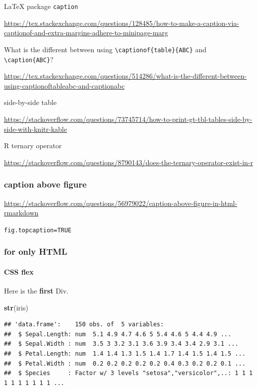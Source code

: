 \documentclass[
]{book}
\newenvironment{Shaded}{\begin{snugshade}}{\end{snugshade}}
\newcommand{\FunctionTok}[1]{\textcolor[rgb]{0.13,0.29,0.53}{\textbf{#1}}}
\newcommand{\NormalTok}[1]{#1}
\theoremstyle{definition}
\theoremstyle{definition}
\theoremstyle{definition}
\theoremstyle{definition}
\theoremstyle{remark}
\begin{document}
LaTeX package \texttt{caption}

\url{https://tex.stackexchange.com/questions/128485/how-to-make-a-caption-via-captionof-and-extra-margins-adhere-to-minipage-marg}

What is the different between using \texttt{\textbackslash{}captionof\{table\}\{ABC\}} and \texttt{\textbackslash{}caption\{ABC\}}?

\url{https://tex.stackexchange.com/questions/514286/what-is-the-different-between-using-captionoftableabc-and-captionabc}

side-by-side table

\url{https://stackoverflow.com/questions/73745714/how-to-print-gt-tbl-tables-side-by-side-with-knitr-kable}

R ternary operator

\url{https://stackoverflow.com/questions/8790143/does-the-ternary-operator-exist-in-r}

\hypertarget{caption-above-figure}{%
\subsubsection{caption above figure}\label{caption-above-figure}}

\url{https://stackoverflow.com/questions/56979022/caption-above-figure-in-html-rmarkdown}

\texttt{fig.topcaption=TRUE}

\hypertarget{for-only-html}{%
\subsubsection{for only HTML}\label{for-only-html}}

\hypertarget{css-flex}{%
\paragraph{CSS flex}\label{css-flex}}

Here is the \textbf{first} Div.

\begin{Shaded}
\begin{Highlighting}[]
\FunctionTok{str}\NormalTok{(iris)}
\end{Highlighting}
\end{Shaded}

\begin{verbatim}
## 'data.frame':    150 obs. of  5 variables:
##  $ Sepal.Length: num  5.1 4.9 4.7 4.6 5 5.4 4.6 5 4.4 4.9 ...
##  $ Sepal.Width : num  3.5 3 3.2 3.1 3.6 3.9 3.4 3.4 2.9 3.1 ...
##  $ Petal.Length: num  1.4 1.4 1.3 1.5 1.4 1.7 1.4 1.5 1.4 1.5 ...
##  $ Petal.Width : num  0.2 0.2 0.2 0.2 0.2 0.4 0.3 0.2 0.2 0.1 ...
##  $ Species     : Factor w/ 3 levels "setosa","versicolor",..: 1 1 1 1 1 1 1 1 1 1 ...
\end{verbatim}
\end{document}
